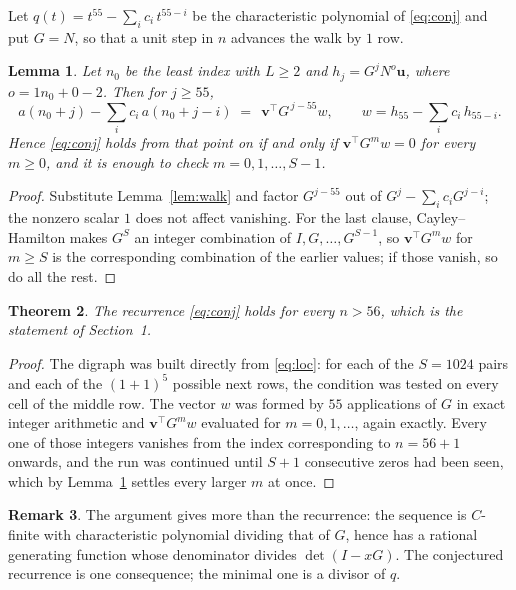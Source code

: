 \documentclass[11pt,a4paper]{article}
\theoremstyle{plain}
\newtheorem{theorem}{Theorem}
\newtheorem{lemma}[theorem]{Lemma}
\theoremstyle{definition}
\newtheorem{remark}[theorem]{Remark}
\begin{document}
Let $q(t)=t^{55}-\sum_i c_i\,t^{55-i}$ be the characteristic polynomial of
\eqref{eq:conj} and put $G=N$, so that a unit step in $n$ advances the walk by
$1$ row.

\begin{lemma}\label{lem:crit}
Let $n_0$ be the least index with $L\ge2$ and $h_j=G^{j}N^{o}\mathbf{u}$, where
$o=1n_0+0-2$. Then for $j\ge55$,
\[
a(n_0+j)-\sum_i c_i\,a(n_0+j-i)\;=\;\,\mathbf{v}^{\!\top}G^{\,j-55}w,
\qquad w=h_{55}-\sum_i c_i\,h_{55-i} .
\]
Hence \eqref{eq:conj} holds from that point on if and only if
$\mathbf{v}^{\!\top}G^{m}w=0$ for every $m\ge0$, and it is enough to check
$m=0,1,\dots,S-1$.
\end{lemma}

\begin{proof}
Substitute Lemma~\ref{lem:walk} and factor $G^{j-55}$ out of
$G^{j}-\sum_ic_iG^{j-i}$; the nonzero scalar $1$ does not affect
vanishing. For the last clause, Cayley--Hamilton makes $G^{S}$ an integer combination of
$I,G,\dots,G^{S-1}$, so $\mathbf{v}^{\!\top}G^{m}w$ for $m\ge S$ is the corresponding
combination of the earlier values; if those vanish, so do all the rest.
\end{proof}

\begin{theorem}
The recurrence \eqref{eq:conj} holds for every $n>56$, which is the statement of
Section~1.
\end{theorem}

\begin{proof}
The digraph was built directly from \eqref{eq:loc}: for each of the $S=1024$ pairs and each
of the $(1+1)^{5}$ possible next rows, the condition was tested on every cell of
the middle row. The vector $w$ was formed by $55$ applications of $G$ in exact integer
arithmetic and $\mathbf{v}^{\!\top}G^{m}w$ evaluated for $m=0,1,\dots$, again exactly.
Every one of those integers vanishes from the index corresponding to $n=56+1$ onwards,
and the run was continued until $S+1$ consecutive zeros had been seen, which by
Lemma~\ref{lem:crit} settles every larger $m$ at once.
\end{proof}

\begin{remark}
The argument gives more than the recurrence: the sequence is $C$-finite with characteristic
polynomial dividing that of $G$, hence has a rational generating function whose denominator
divides $\det(I-xG)$. The conjectured recurrence is one consequence; the minimal one is a
divisor of $q$.
\end{remark}
\end{document}
